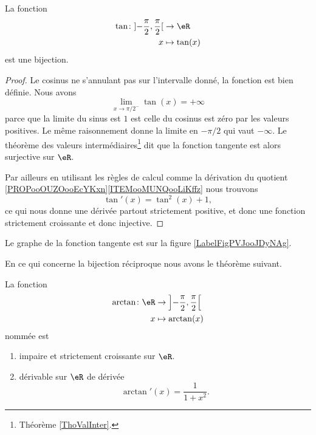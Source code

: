 \begin{proposition}
    La fonction
    \begin{equation}
        \begin{aligned}
        \tan\colon \mathopen] -\frac{ \pi }{ 2 } , \frac{ \pi }{2} \mathclose[&\to \eR \\
            x&\mapsto \tan(x) 
        \end{aligned}
    \end{equation}
    est une bijection.
\end{proposition}

\begin{proof}
    Le cosinus ne s'annulant pas sur l'intervalle donné, la fonction est bien définie. Nous avons
    \begin{equation}
        \lim_{x\to \pi/2^-} \tan(x)=+\infty
    \end{equation}
    parce que la limite du sinus est \( 1\) est celle du cosinus est zéro par les valeurs positives. Le même raisonnement donne la limite en \( -\pi/2\) qui vaut \( -\infty\). Le théorème des valeurs intermédiaires\footnote{Théorème \ref{ThoValInter}.} dit que la fonction tangente est alors surjective sur \( \eR\).

    Par ailleurs en utilisant les règles de calcul comme la dérivation du quotient \ref{PROPooOUZOooEcYKxn}\ref{ITEMooMUNQooLiKffz} nous trouvons
    \begin{equation}
        \tan'(x)=\tan^2(x)+1,
    \end{equation}
    ce qui nous donne une dérivée partout strictement positive, et donc une fonction strictement croissante et donc injective.
\end{proof}

Le graphe de la fonction tangente est sur la figure \ref{LabelFigPVJooJDyNAg}. %
\newcommand{\CaptionFigPVJooJDyNAg}{Le graphe de la fonction tangente.}


En ce qui concerne la bijection réciproque nous avons le théorème suivant.
\begin{theorem}     \label{THOooUSVGooOAnCvC}
    La fonction
    \begin{equation}
        \begin{aligned}
        \arctan\colon \eR&\to \left] -\frac{ \pi }{2} , \frac{ \pi }{2} \right[ \\
            x&\mapsto \arctan(x) 
        \end{aligned}
    \end{equation}
    nommée  est
    \begin{enumerate}
        \item
            impaire et strictement croissante sur \( \eR\).
        \item       \label{ITEMooMNHLooOVhIIb}
            dérivable sur \( \eR\) de dérivée
            \begin{equation}
                \arctan'(x)=\frac{1}{ 1+x^2 }.
            \end{equation}
    \end{enumerate}
\end{theorem}


